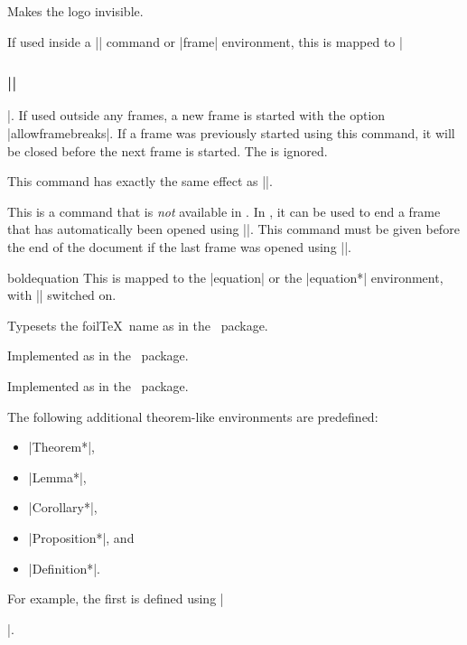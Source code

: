 \begin{command}{\LogoOff}
  Makes the logo invisible.
\end{command}

\begin{command}{\foilhead{}}
  If used inside a |\frame| command or |frame| environment, this is mapped to |\frametitle{||}|. If used outside any frames, a new frame is started with the option |allowframebreaks|. If a frame was previously started using this command, it will be closed before the next frame is started. The  is ignored.
\end{command}

\begin{command}{\rotatefoilhead{}}
  This command has exactly the same effect as |\foilhead|.
\end{command}

\begin{command}{\endfoil}
  This is a command that is \emph{not} available in \foils. In \beamer, it can be used to end a frame that has automatically been opened using |\foildhead|. This command must be given before the end of the document if the last frame was opened using |\foildhead|.
\end{command}

\begin{environment}{{boldequation}\opt{|*|}}
  This is mapped to the |equation| or the |equation*| environment, with |\boldmath| switched on.
\end{environment}

\begin{command}{\FoilTeX}
  Typesets the foil\TeX\ name as in the \foils\ package.
\end{command}

\begin{command}{\bm{}}
  Implemented as in the \foils\ package.
\end{command}

\begin{command}{\bmstyle{}}
  Implemented as in the \foils\ package.
\end{command}

The following additional theorem-like environments are predefined:
\begin{itemize}
  \item |Theorem*|,
  \item |Lemma*|,
  \item |Corollary*|,
  \item |Proposition*|, and
  \item |Definition*|.
\end{itemize}
For example, the first is defined using |\newtheorem*{Theorem*}{Theorem}|.

